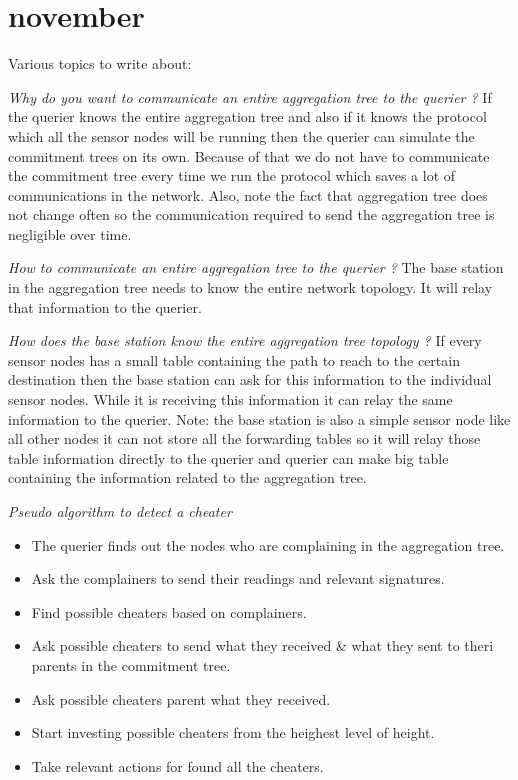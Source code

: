 \chapter{november}

Various topics to write about:

\textit{Why do you want to communicate an entire aggregation tree to the querier ?}
	If the querier knows the entire aggregation tree and also if it knows the protocol which all the sensor nodes will be running then the querier can simulate the commitment trees on its own. Because of that we do not have to communicate the commitment tree every time we run the protocol which saves a lot of communications in the network. Also, note the fact that aggregation tree does not change often so the communication required to send the aggregation tree is negligible over time.

\textit{How to communicate an entire aggregation tree to the querier ?}
	The base station in the aggregation tree needs to know the entire network topology.
	It will relay that information to the querier.

\textit{How does the base station know the entire aggregation tree topology ?}
	If every sensor nodes has a small table containing the path to reach to the certain destination then the base station can ask for this information to the individual sensor nodes. While it is receiving this information it can relay the same information to the querier. Note: the base station is also a simple sensor node like all other nodes it can not store all the forwarding tables so it will relay those table information directly to the querier and querier can make big table containing the information related to the aggregation tree.

\textit{Pseudo algorithm to detect a cheater}
	
	\begin{itemize}

	\item{The querier finds out the nodes who are complaining in the aggregation tree.}

	\item{Ask the complainers to send their readings and relevant signatures.}

	\item{Find possible cheaters based on complainers.}

	\item{Ask possible cheaters to send what they received \& what they sent to theri parents in the commitment tree.}

	\item{Ask possible cheaters parent what they received.}

	\item{Start investing possible cheaters from the heighest level of height.}

	\item{Take relevant actions for found all the cheaters.} 

	\end{itemize}

